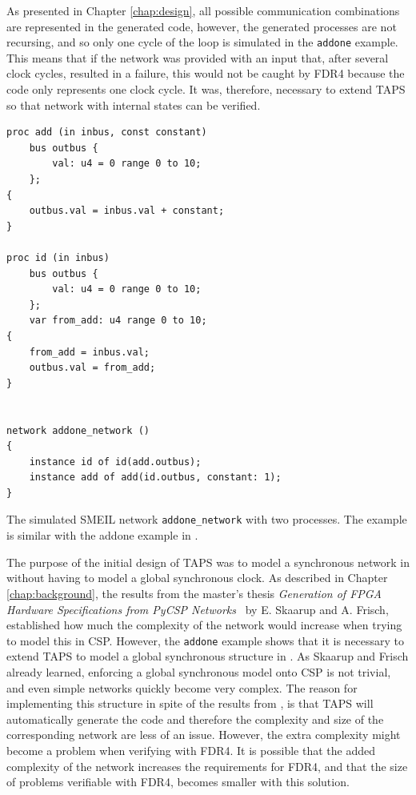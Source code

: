 As presented in Chapter \ref{chap:design}, all possible communication combinations are represented in the generated \cspm{} code, however, the generated \cspm{} processes are not recursing, and so only one cycle of the loop is simulated in the \texttt{addone} example. This means that if the network was provided with an input that, after several clock cycles, resulted in a failure, this would not be caught by FDR4 because the \cspm{} code only represents one clock cycle. It was, therefore, necessary to extend TAPS so that network with internal states can be verified.\\
\begin{listing}
\begin{verbatim}
proc add (in inbus, const constant)
    bus outbus {
        val: u4 = 0 range 0 to 10;
    };
{
    outbus.val = inbus.val + constant;
}

proc id (in inbus)
    bus outbus {
        val: u4 = 0 range 0 to 10;
    };
    var from_add: u4 range 0 to 10;
{
    from_add = inbus.val;
    outbus.val = from_add;
}


network addone_network ()
{
    instance id of id(add.outbus);
    instance add of add(id.outbus, constant: 1);
}
\end{verbatim}
\caption{The simulated SMEIL network \texttt{addone\_network} with two processes. The example is similar with the addone example in \cite{smeil}.}
\label{lst:addone_smeil_example}
\end{listing}

The purpose of the initial design of TAPS was to model a synchronous network in \cspm{} without having to model a global synchronous clock. As described in Chapter \ref{chap:background}, the results from the master's thesis \textit{Generation of FPGA Hardware
Specifications from PyCSP Networks}~\cite{Skaarup14} by E. Skaarup and A. Frisch, established how much the complexity of the network would increase when trying to model this in CSP.
However, the \texttt{addone} example shows that it is necessary to extend TAPS to model a global synchronous structure in \cspm{}. As Skaarup and Frisch already learned, enforcing a global synchronous model onto CSP is not trivial, and even simple networks quickly become very complex. The reason for implementing this structure in spite of the results from \cite{Skaarup14}, is that TAPS will automatically generate the \cspm{} code and therefore the complexity and size of the corresponding \cspm{} network are less of an issue. However, the extra complexity might become a problem when verifying with FDR4. It is possible that the added complexity of the network increases the requirements for FDR4, and that the size of problems verifiable with FDR4, becomes smaller with this solution. \\

